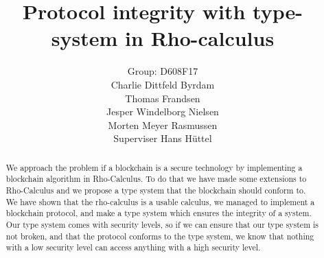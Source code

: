 \mainmatter  %

\title{Protocol integrity with type-system in Rho-calculus}




\author{Group: D608F17\\Charlie Dittfeld Byrdam\\Thomas Frandsen\\Jesper Windelborg Nielsen\\Morten Meyer Rasmussen\\Superviser Hans Hüttel}




\toctitle{}
\tocauthor{}
\maketitle
\clearpage
\begin{abstract}
We approach the problem if a blockchain is a secure technology by implementing a blockchain algorithm in Rho-Calculus. To do that we have made some extensions to Rho-Calculus and we propose a type system that the blockchain should conform to. We have shown that the rho-calculus is a usable calculus, we managed to implement a blockchain protocol, and make a type system which ensures the integrity of a system. Our type system comes with security levels, so if we can ensure that our type system is not broken, and that the protocol conforms to the type system, we know that nothing with a low security level can access anything with a high security level.
\end{abstract}
